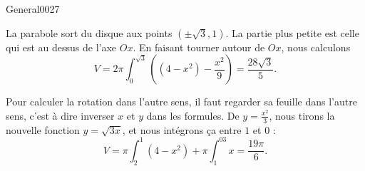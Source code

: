 \begin{corrige}{General0027}

La parabole \og sort\fg{} du disque aux points $(\pm\sqrt{3},1)$. La partie plus petite est celle qui est au dessus de l'axe $Ox$. En faisant tourner autour de $Ox$, nous calculons 
\begin{equation}
	V=2\pi\int_{0}^{\sqrt{3}}\left( (4-x^2)-\frac{ x^2 }{ 9 } \right)=\frac{ 28\sqrt{3} }{ 5 }.
\end{equation}

Pour calculer la rotation dans l'autre sens, il faut regarder sa feuille dans l'autre sens, c'est à dire inverser $x$ et $y$ dans les formules. De $y=\frac{ x^2 }{ 3 }$, nous tirons la nouvelle fonction $y=\sqrt{3x}$, et nous intégrons ça entre $1$ et $0$ :
\begin{equation}
	V=\pi\int_2^1(4-x^2)+\pi\int_1^03x=\frac{ 19\pi }{ 6 }.
\end{equation}

\end{corrige}
